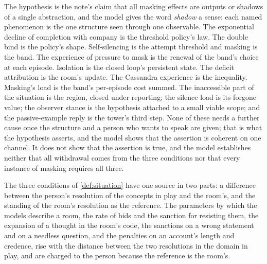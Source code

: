 The hypothesis is the note's claim that all masking effects are outputs or shadows of a single abstraction, and the model gives the word \emph{shadow} a sense: each named phenomenon is the one structure seen through one observable. The exponential decline of completion with company is the threshold policy's law. The double bind is the policy's shape. Self-silencing is the attempt threshold and masking is the band. The experience of pressure to mask is the renewal of the band's choice at each episode. Isolation is the closed loop's persistent state. The deficit attribution is the room's update. The Cassandra experience is the inequality. Masking's load is the band's per-episode cost summed. The inaccessible part of the situation is the region, closed under reporting; the silence load is its forgone value; the observer stance is the hypothesis attached to a small viable scope; and the passive-example reply is the tower's third step. None of these needs a further cause once the structure and a person who wants to speak are given; that is what the hypothesis asserts, and the model shows that the assertion is coherent on one channel. It does not show that the assertion is true, and the model establishes neither that all withdrawal comes from the three conditions nor that every instance of masking requires all three.

\begin{hypothesis}\label{hyp:source}
The three conditions of \autoref{def:situation} have one source in two parts: a difference between the person's resolution of the concepts in play and the room's, and the standing of the room's resolution as the reference. The parameters by which the models describe a room, the rate of bids and the sanction for resisting them, the expansion of a thought in the room's code, the sanctions on a wrong statement and on a needless question, and the penalties on an account's length and credence, rise with the distance between the two resolutions in the domain in play, and are charged to the person because the reference is the room's.
\end{hypothesis}

